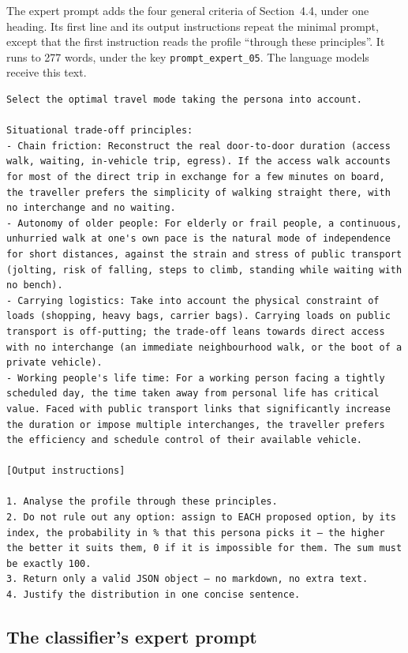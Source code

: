 The expert prompt adds the four general criteria of Section~4.4, under one heading. Its first
line and its output instructions repeat the minimal prompt, except that the first instruction
reads the profile ``through these principles''. It runs to 277 words, under the key
\texttt{prompt\_expert\_05}. The language models receive this text.

\begin{Verbatim}
Select the optimal travel mode taking the persona into account.

Situational trade-off principles:
- Chain friction: Reconstruct the real door-to-door duration (access walk, waiting, in-vehicle trip, egress). If the access walk accounts for most of the direct trip in exchange for a few minutes on board, the traveller prefers the simplicity of walking straight there, with no interchange and no waiting.
- Autonomy of older people: For elderly or frail people, a continuous, unhurried walk at one's own pace is the natural mode of independence for short distances, against the strain and stress of public transport (jolting, risk of falling, steps to climb, standing while waiting with no bench).
- Carrying logistics: Take into account the physical constraint of loads (shopping, heavy bags, carrier bags). Carrying loads on public transport is off-putting; the trade-off leans towards direct access with no interchange (an immediate neighbourhood walk, or the boot of a private vehicle).
- Working people's life time: For a working person facing a tightly scheduled day, the time taken away from personal life has critical value. Faced with public transport links that significantly increase the duration or impose multiple interchanges, the traveller prefers the efficiency and schedule control of their available vehicle.

[Output instructions]

1. Analyse the profile through these principles.
2. Do not rule out any option: assign to EACH proposed option, by its index, the probability in % that this persona picks it — the higher the better it suits them, 0 if it is impossible for them. The sum must be exactly 100.
3. Return only a valid JSON object — no markdown, no extra text.
4. Justify the distribution in one concise sentence.
\end{Verbatim}

\subsection{The classifier's expert prompt}
\label{app:classifier}

